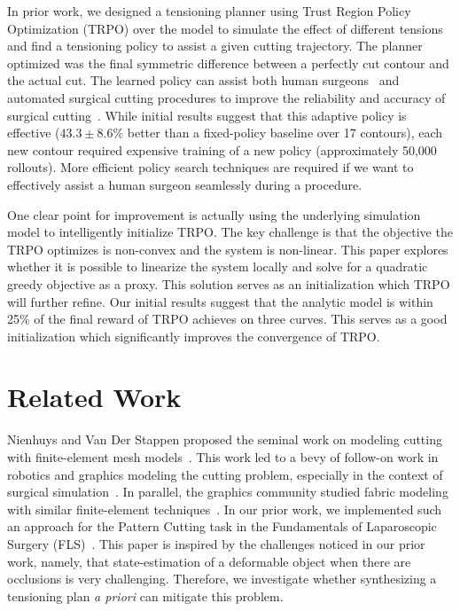 In prior work, we designed a tensioning planner using Trust Region Policy Optimization (TRPO) over the model to simulate the effect of different tensions and find a tensioning policy to assist a given cutting trajectory. 
The planner optimized was the final symmetric difference between a perfectly cut contour and the actual cut.
The learned policy can assist both human surgeons~\cite{reiley2010motion} and automated surgical cutting procedures to improve the reliability and accuracy of surgical cutting~\cite{swirl2016,murali2015learning}.
While initial results suggest that this adaptive policy is effective ($43.3\pm8.6\%$ better than a fixed-policy baseline over 17 contours), each new contour required expensive training of a new policy (approximately 50,000 rollouts). 
More efficient policy search techniques are required if we want to effectively assist a human surgeon seamlessly during a procedure.

One clear point for improvement is actually using the underlying simulation model to intelligently initialize TRPO.
The key challenge is that the objective the TRPO optimizes is non-convex and the system is non-linear.
This paper explores whether it is possible to linearize the system locally and solve for a quadratic greedy objective as a proxy.
This solution serves as an initialization which TRPO will further refine.
Our initial results suggest that the analytic model is within 25\% of the final reward of TRPO achieves on three curves.
This serves as a good initialization which significantly improves the convergence of TRPO.


\section{Related Work}
Nienhuys and Van Der Stappen proposed the seminal work on modeling cutting with finite-element mesh models~\cite{nienhuys2001surgery}.
This work led to a bevy of follow-on work in robotics and graphics modeling the cutting problem, especially in the context of surgical simulation~\cite{bielser2004state, sifakis2007arbitrary, mendoza2003simulating, steinemann2006hybrid}.
In parallel, the graphics community studied fabric modeling with similar finite-element techniques~\cite{gale2016patterning, brookes16tearable}.
In our prior work, we implemented such an approach for the Pattern Cutting task in the Fundamentals of Laparoscopic Surgery (FLS)~\cite{thananjeyanmultilateral}.
This paper is inspired by the challenges noticed in our prior work, namely, that state-estimation of a deformable object when there are occlusions is very challenging. 
Therefore, we investigate whether synthesizing a tensioning plan \emph{a priori} can mitigate this problem.

